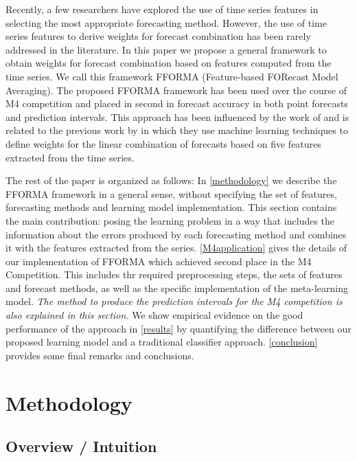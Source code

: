 \documentclass[11pt,a4paper,]{article}
\theoremstyle{definition}
\theoremstyle{definition}
\theoremstyle{definition}
\theoremstyle{remark}
\begin{document}
Recently, a few researchers have explored the use of time series
features in selecting the most appropriate forecasting method. However,
the use of time series features to derive weights for forecast
combination has been rarely addressed in the literature. In this paper
we propose a general framework to obtain weights for forecast
combination based on features computed from the time series. We call
this framework FFORMA (Feature-based FORecast Model Averaging). The
proposed FFORMA framework has been used over the course of M4
competition and placed in second in forecast accuracy in both point
forecasts and prediction intervals. This approach has been influenced by
the work of \textcite{fforms} and is related to the previous work by
\textcite{prudencio2004using} in which they use machine learning
techniques to define weights for the linear combination of forecasts
based on five features extracted from the time series.

The rest of the paper is organized as follows: In \autoref{methodology}
we describe the FFORMA framework in a general sense, without specifying
the set of features, forecasting methods and learning model
implementation. This section contains the main contribution: posing the
learning problem in a way that includes the information about the errors
produced by each forecasting method and combines it with the features
extracted from the series. \autoref{M4application} gives the details of
our implementation of FFORMA which achieved second place in the M4
Competition. This includes thr required preprocessing steps, the sets of
features and forecast methods, as well as the specific implementation of
the meta-learning model. \emph{The method to produce the prediction
intervals for the M4 competition is also explained in this section.} We
show empirical evidence on the good performance of the approach in
\autoref{results} by quantifying the difference between our proposed
learning model and a traditional classifier approach.
\autoref{conclusion} provides some final remarks and conclusions.

\section{Methodology}\label{methodology}

\subsection{Overview / Intuition}\label{overview-intuition}
\end{document}
